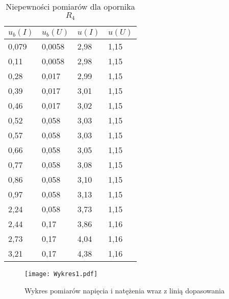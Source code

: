 \documentclass{article}
\begin{document}
\begin{table}[h!]
\centering
\begin{tabular}{|l|l|l|l|}
\hline
$u_b(I)$ & $u_b(U)$ & $u(I)$ & $u(U)$ \\ \hline
0,079   & 0,0058  & 2,98 & 1,15 \\ \hline
0,11    & 0,0058  & 2,98 & 1,15 \\ \hline
0,28    & 0,017   & 2,99 & 1,15 \\ \hline
0,39    & 0,017   & 3,01 & 1,15 \\ \hline
0,46    & 0,017   & 3,02 & 1,15 \\ \hline
0,52    & 0,058   & 3,03 & 1,15 \\ \hline
0,57    & 0,058   & 3,03 & 1,15 \\ \hline
0,66    & 0,058   & 3,05 & 1,15 \\ \hline
0,77    & 0,058   & 3,08 & 1,15 \\ \hline
0,86    & 0,058   & 3,10 & 1,15 \\ \hline
0,97    & 0,058   & 3,13 & 1,15 \\ \hline
2,24    & 0,058   & 3,73 & 1,15 \\ \hline
2,44    & 0,17    & 3,86 & 1,16 \\ \hline
2,73    & 0,17    & 4,04 & 1,16 \\ \hline
3,21    & 0,17    & 4,38 & 1,16 \\ \hline
\end{tabular}
\caption{Niepewności pomiarów dla opornika $ R_4 $}
\end{table}



\begin{figure}[h!]
\centering
\texttt{[image: Wykres1.pdf]}
\caption{Wykres pomiarów napięcia i natężenia wraz z linią dopasowania}
\end{figure}
\end{document}
